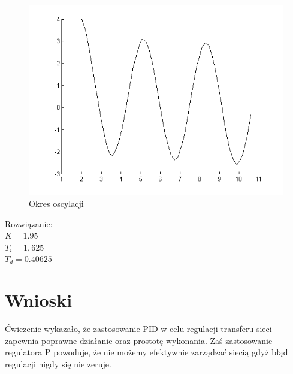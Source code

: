 \documentclass[a4paper,10pt]{article}
\begin{document}
\begin{figure}[!h]
    \centering
	\includegraphics[width=120mm]{CW5-ZN-osc.png}
	\caption{Okres oscylacji}
    \label{fig:symulacjaP}
\end{figure}
\newpage
Rozwiązanie:\\
$K = 1.95$\\
$T_i = 1,625$\\
$T_d = 0.40625$ \\





\section{Wnioski}\label{sec:wnioski}
Ćwiczenie wykazało, że zastosowanie PID w celu regulacji transferu sieci zapewnia poprawne działanie oraz prostotę wykonania. Zaś zastosowanie regulatora P powoduje, że nie możemy efektywnie zarządzać siecią gdyż błąd regulacji nigdy się nie zeruje.
\end{document}
